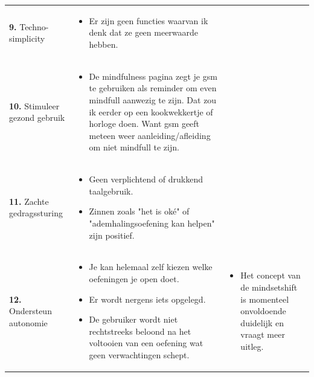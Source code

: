 {\begin{longtable}{
            >{\raggedright\arraybackslash}p{5.23cm}
            >{\raggedright\arraybackslash}p{4.93cm}
            >{\raggedright\arraybackslash}p{4.93cm}
        }
        \addlinespace[5pt]
        
        \textbf{9.} Techno-simplicity
        &  
        \begin{itemize}[nosep,leftmargin=*,itemsep=10pt] 
            \renewcommand{\labelitemi}{+} 
            \item Er zijn geen functies waarvan ik denk dat ze geen meerwaarde hebben.
        \end{itemize} 
        &
        \\
        
        \addlinespace[5pt]
        
        \textbf{10.} Stimuleer gezond gebruik
        &  
        \begin{itemize}[nosep,leftmargin=*,itemsep=10pt] 
            \renewcommand{\labelitemi}{+}
            \item De mindfulness pagina zegt je gsm te gebruiken als reminder om even mindfull aanwezig te zijn. Dat zou ik eerder op een kookwekkertje of horloge doen. Want gsm geeft meteen weer aanleiding/afleiding om niet mindfull te zijn.
        \end{itemize} 
        &
        \\
        
        \addlinespace[5pt]
        
        \textbf{11.} Zachte gedragssturing
        &  
        \begin{itemize}[nosep,leftmargin=*,itemsep=10pt] 
            \renewcommand{\labelitemi}{+}
            \item Geen verplichtend of drukkend taalgebruik.
            \item Zinnen zoals "het is oké" of "ademhalingsoefening kan helpen" zijn positief.
        \end{itemize} 
        &
        \\
        
        \addlinespace[5pt]
        
        \textbf{12.} Ondersteun autonomie
        &  
        \begin{itemize}[nosep,leftmargin=*,itemsep=10pt] 
            \renewcommand{\labelitemi}{+} 
            \item Je kan helemaal zelf kiezen welke oefeningen je open doet.
            \item Er wordt nergens iets opgelegd.
            \item De gebruiker wordt niet rechtstreeks beloond na het voltooien van een oefening wat geen verwachtingen schept.
        \end{itemize} 
        &
        \begin{itemize}[nosep,leftmargin=*,itemsep=10pt] 
            \renewcommand{\labelitemi}{-} 
            \item Het concept van de mindsetshift is momenteel onvoldoende duidelijk en vraagt meer uitleg.
        \end{itemize}
        \\
        

\end{longtable}}
